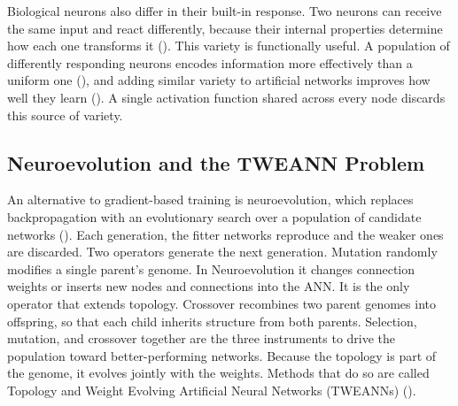 \documentclass[12pt]{article}
\begin{document}
Biological neurons also differ in their built-in response.
Two neurons can receive the same input and react differently, because their internal properties determine how each one transforms it (\cite{drion_ion_2015}).
This variety is functionally useful.
A population of differently responding neurons encodes information more effectively than a uniform one (\cite{tripathy_intermediate_2013}), and adding similar variety to artificial networks improves how well they learn (\cite{perez-nieves_neural_2021}).
A single activation function shared across every node discards this source of variety.



\subsection{Neuroevolution and the TWEANN Problem}
\label{subsec:neuroevolution}


An alternative to gradient-based training is neuroevolution, which replaces backpropagation with an evolutionary search over a population of candidate networks (\cite{stanley_designing_2019}).
Each generation, the fitter networks reproduce and the weaker ones are discarded.
Two operators generate the next generation.
Mutation randomly modifies a single parent's genome. In Neuroevolution it changes connection weights or inserts new nodes and connections into the ANN. It is the only operator that extends topology.
Crossover recombines two parent genomes into offspring, so that each child inherits structure from both parents.
Selection, mutation, and crossover together are the three instruments to drive the population toward better-performing networks.
Because the topology is part of the genome, it evolves jointly with the weights. Methods that do so are called Topology and Weight Evolving Artificial Neural Networks (TWEANNs) (\cite{stanley_evolving_2002}).
\end{document}
